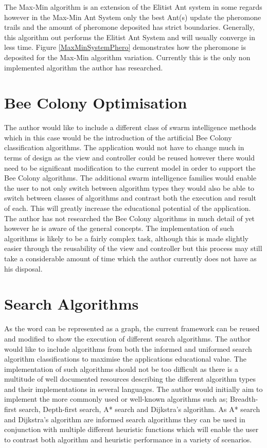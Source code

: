 The Max-Min algorithm is an extension of the Elitist Ant system in some regards however in the Max-Min Ant System only the best Ant(s) update the pheromone trails and the amount of pheromone deposited has strict boundaries. Generally, this algorithm out performs the Elitist Ant System and will usually converge in less time. Figure \ref{MaxMinSystemPhero} demonstrates how the pheromone is deposited for the Max-Min algorithm variation. Currently this is the only non implemented algorithm the author has researched.

\section{Bee Colony Optimisation}

The author would like to include a different class of swarm intelligence methods which in this case would be the introduction of the artificial Bee Colony classification algorithms. The application would not have to change much in terms of design as the view and controller could be reused however there would need to be significant modification to the current model in order to support the Bee Colony algorithms. The additional swarm intelligence families would enable the user to not only switch between algorithm types they would also be able to switch between classes of algorithms and contrast both the execution and result of each. This will greatly increase the educational potential of the application. The author has not researched the Bee Colony algorithms in much detail of yet however he is aware of the general concepts. The implementation of such algorithms is likely to be a fairly complex task, although this is made slightly easier through the reusability of the view and controller but this process may still take a considerable amount of time which the author currently does not have as his disposal.

\section{Search Algorithms}

As the word can be represented as a graph, the current framework can be reused and modified to show the execution of different search algorithms. The author would like to include algorithms from both the informed and uniformed search algorithm classifications to maximise the applications educational value. The implementation of such algorithms should not be too difficult as there is a multitude of well documented resources describing the different algorithm types and their implementations in several languages. The author would initially aim to implement the more commonly used or well-known algorithms such as; Breadth-first search, Depth-first search, A* search and Dijkstra's algorithm. As A* search and Dijkstra's algorithm are informed search algorithms they can be used in conjunction with multiple different heuristic functions which will enable the user to contrast both algorithm and heuristic performance in a variety of scenarios.

